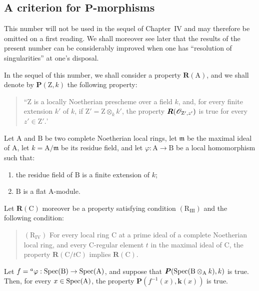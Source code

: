 \subsection{A criterion for \texorpdfstring{$\boldsymbol{P}$}{P}-morphisms}
\label{subsection:IV.7.5}

\begin{env}[7.5.0]
\label{IV.7.5.0}
This number will not be used in the sequel of Chapter~IV and may therefore be omitted on a first reading. We shall moreover see later  that the results of the present number can be considerably improved when one has ``resolution of singularities'' at one's disposal.

In the sequel of this number, we shall consider a property $\boldsymbol{R}(\mathrm{A})$, and we shall denote by $\boldsymbol{P}(\mathrm{Z},k)$ the following property:
\begin{quote}
``$\mathrm{Z}$ is a locally Noetherian prescheme over a field $k$, and, for every finite extension $k'$ of $k$, if $\mathrm{Z}'=\mathrm{Z}\otimes_k k'$, the property $\boldsymbol{R}(\mathscr{O}_{\mathrm{Z}',z'})$ is true for every $z'\in\mathrm{Z}'.$'
\end{quote}
\end{env}

\begin{theorem}[7.5.1]
\label{IV.7.5.1}
Let $\mathrm{A}$ and $\mathrm{B}$ be two complete Noetherian local rings, let $\mathfrak{m}$ be the maximal ideal of $\mathrm{A}$, let $k=\mathrm{A}/\mathfrak{m}$ be its residue field, and let $\varphi:\mathrm{A}\to\mathrm{B}$ be a local homomorphism such that:
\begin{enumerate}[label=(\roman*)]
  \item the residue field of $\mathrm{B}$ is a finite extension of $k$;
  \item $\mathrm{B}$ is a flat $\mathrm{A}$-module.
\end{enumerate}
Let $\boldsymbol{R}(\mathrm{C})$ moreover be a property satisfying condition $(\mathrm{R}_{\mathrm{III}})$  and the following condition:
\begin{quote}
$(\mathrm{R}_{\mathrm{IV}})$ For every local ring $\mathrm{C}$ at a prime ideal of a complete Noetherian local ring, and every $\mathrm{C}$-regular element $t$ in the maximal ideal of $\mathrm{C}$, the property $\boldsymbol{R}(\mathrm{C}/t\mathrm{C})$ implies $\boldsymbol{R}(\mathrm{C})$.
\end{quote}


Let $f={}^a\varphi:\operatorname{Spec}(\mathrm{B})\to\operatorname{Spec}(\mathrm{A})$, and suppose that $\boldsymbol{P}(\operatorname{Spec}(\mathrm{B}\otimes_\mathrm{A}k),k)$ is true. Then, for every $x\in\operatorname{Spec}(\mathrm{A})$, the property $\boldsymbol{P}(f^{-1}(x),\boldsymbol{k}(x))$ is true.
\end{theorem}

